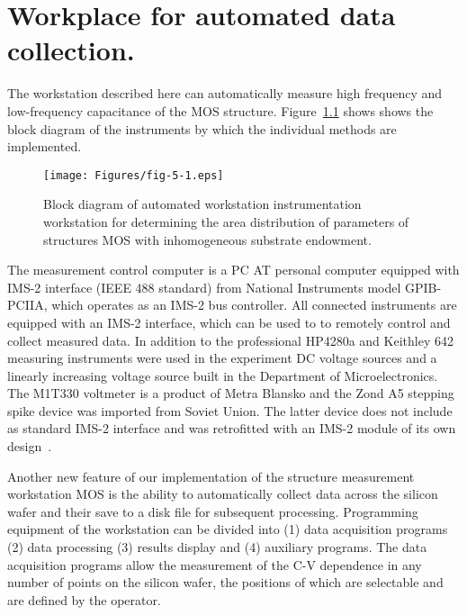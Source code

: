 
\chapter{Workplace for automated data collection.}\label{Chapter5}

The workstation described here can automatically measure high
frequency and low-frequency capacitance of the MOS
structure. Figure~\ref{fig:5.1} shows shows the block diagram of the
instruments by which the individual methods are implemented.

\begin{figure}[h!]\centering
  \texttt{[image: Figures/fig-5-1.eps]}%
  \caption[Block diagram of automated instrumentation
    workstation]{Block diagram of automated workstation
    instrumentation workstation for determining the area distribution
    of parameters of structures MOS with inhomogeneous substrate
    endowment.}\label{fig:5.1}
\end{figure}

The measurement control computer is a PC AT personal computer equipped
with IMS-2 interface (IEEE 488 standard) from National Instruments
model GPIB-PCIIA, which operates as an IMS-2 bus controller. All
connected instruments are equipped with an IMS-2 interface, which can
be used to to remotely control and collect measured data. In addition
to the professional HP4280a and Keithley 642 measuring instruments
were used in the experiment DC voltage sources and a linearly
increasing voltage source built in the Department of
Microelectronics. The M1T330 voltmeter is a product of Metra Blansko
and the Zond A5 stepping spike device was imported from Soviet
Union. The latter device does not include as standard IMS-2 interface
and was retrofitted with an IMS-2 module of its own design~\cite{5.1}.

Another new feature of our implementation of the structure measurement
workstation MOS is the ability to automatically collect data across
the silicon wafer and their save to a disk file for subsequent
processing. Programming equipment of the workstation can be divided
into (1) data acquisition programs (2) data processing (3) results
display and (4) auxiliary programs. The data acquisition programs
allow the measurement of the C-V dependence in any number of points on
the silicon wafer, the positions of which are selectable and are
defined by the operator.

